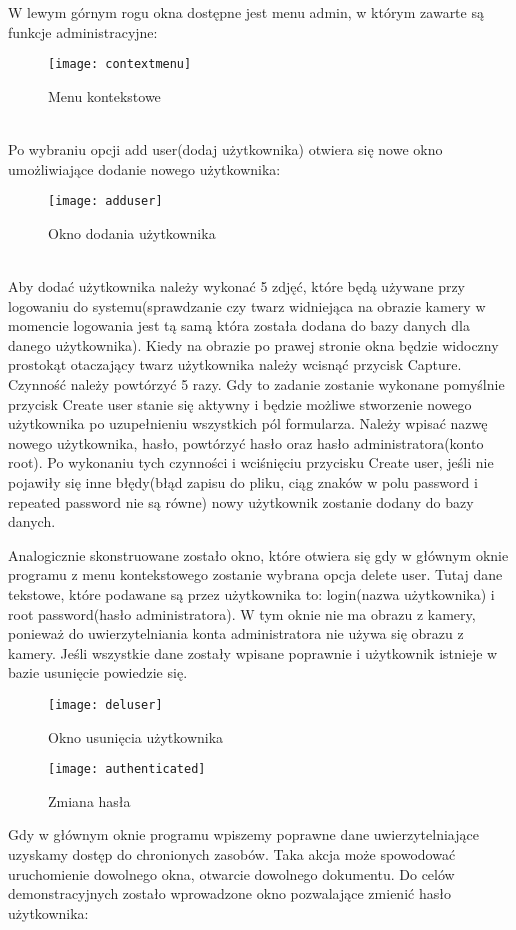 \documentclass[eng,printmode]{mgr}
\begin{document}
W lewym górnym rogu okna dostępne jest menu admin, w którym zawarte są funkcje administracyjne:\\
\begin{figure}[placement h]
\texttt{[image: contextmenu]}
\caption{Menu kontekstowe}
\end{figure}\\

Po wybraniu opcji add user(dodaj użytkownika) otwiera się nowe okno umożliwiające dodanie nowego użytkownika:\\
\begin{figure}[placement h]
\texttt{[image: adduser]}
\caption{Okno dodania użytkownika}
\end{figure}\\
Aby dodać użytkownika należy wykonać 5 zdjęć, które będą używane przy logowaniu do systemu(sprawdzanie czy twarz widniejąca na obrazie kamery w momencie logowania jest tą samą która została dodana do bazy danych dla danego użytkownika). Kiedy na obrazie po prawej stronie okna będzie widoczny prostokąt otaczający twarz użytkownika należy wcisnąć przycisk Capture. Czynność należy powtórzyć 5 razy. Gdy to zadanie zostanie wykonane pomyślnie przycisk Create user stanie się aktywny i będzie możliwe stworzenie nowego użytkownika po uzupełnieniu wszystkich pól formularza. Należy wpisać nazwę nowego użytkownika, hasło, powtórzyć hasło oraz hasło administratora(konto root). Po wykonaniu tych czynności i wciśnięciu przycisku Create user, jeśli nie pojawiły się inne błędy(błąd zapisu do pliku, ciąg znaków w polu password i repeated password nie są równe) nowy użytkownik zostanie dodany do bazy danych.

Analogicznie skonstruowane zostało okno, które otwiera się gdy w głównym oknie programu z menu kontekstowego zostanie wybrana opcja delete user. Tutaj dane tekstowe, które podawane są przez użytkownika to: login(nazwa użytkownika) i root password(hasło administratora). W tym oknie nie ma obrazu z kamery, ponieważ do uwierzytelniania konta administratora nie używa się obrazu z kamery. Jeśli wszystkie dane zostały wpisane poprawnie i użytkownik istnieje w bazie usunięcie powiedzie się.\\
\begin{figure}[placement h]
\texttt{[image: deluser]}
\caption{Okno usunięcia użytkownika}
\end{figure}

\begin{figure}[placement H]
\texttt{[image: authenticated]}
\caption{Zmiana hasła}
\end{figure}
Gdy w głównym oknie programu wpiszemy poprawne dane uwierzytelniające uzyskamy dostęp do chronionych zasobów. Taka akcja może spowodować uruchomienie dowolnego okna, otwarcie dowolnego dokumentu. Do celów demonstracyjnych zostało wprowadzone okno pozwalające zmienić hasło użytkownika:\\
\end{document}
